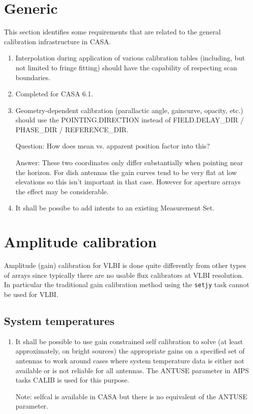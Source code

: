 \documentclass[11pt,a4paper]{article}
\begin{document}
\section{Generic}

This section identifies some requirements that are related to the
general calibration infrastructure in CASA.

\begin{enumerate}[seclist]

\item Interpolation during application of various calibration tables
  (including, but not limited to fringe fitting) should have the
  capability of respecting scan boundaries.

\item Completed for CASA 6.1.

\item Geometry-dependent calibration (parallactic angle, gaincurve,
  opacity, etc.) should use the POINTING.DIRECTION instead of
  FIELD.DELAY{\_}DIR / PHASE{\_}DIR / REFERENCE{\_}DIR.

  Question: How does mean vs. apparent position factor into this?

  Answer: These two coordinates only differ substantially when
  pointing near the horizon.  For dish antennas the gain curves tend
  to be very flat at low elevations so this isn't important in that
  case.  However for aperture arrays the effect may be considerable.

\item It shall be possibe to add intents to an existing Measurement Set.
  
\end{enumerate}


\section{Amplitude calibration}

Amplitude (gain) calibration for VLBI is done quite differently from
other types of arrays since typically there are no usable flux
calibrators at VLBI resolution.  In particular the traditional gain
calibration method using the \texttt{setjy} task cannot be used for
VLBI.


\subsection{System temperatures}

\begin{enumerate}[subseclist]

  \item It shall be possible to use gain constrained self calibration
    to solve (at least approximately, on bright sources) the
    appropriate gains on a specified set of antennas to work around
    cases where system temperature data is either not available or is
    not reliable for all antennas. The ANTUSE parameter in AIPS tasks
    CALIB is used for this purpose.

    Note: selfcal is available in CASA but there is no equivalent of
    the ANTUSE parameter.

\end{enumerate}
\end{document}
